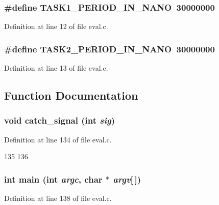 \subsubsection[{TASK1\_\-PERIOD\_\-IN\_\-NANO}]{\setlength{\rightskip}{0pt plus 5cm}\#define TASK1\_\-PERIOD\_\-IN\_\-NANO~30000000}\label{eval_8c_a502e8ff04fbdaca75759b6aa95a80260}


Definition at line 12 of file eval.c.
\subsubsection[{TASK2\_\-PERIOD\_\-IN\_\-NANO}]{\setlength{\rightskip}{0pt plus 5cm}\#define TASK2\_\-PERIOD\_\-IN\_\-NANO~30000000}\label{eval_8c_a7ca9dde848cb8a9965f2f05c0e00fd1d}


Definition at line 13 of file eval.c.

\subsection{Function Documentation}
\subsubsection[{catch\_\-signal}]{\setlength{\rightskip}{0pt plus 5cm}void catch\_\-signal (int {\em sig})}\label{eval_8c_af2dc378d0481adcc49b61efb98493a9b}


Definition at line 134 of file eval.c.


\begin{DoxyCode}
135 {
136 }
\end{DoxyCode}
\subsubsection[{main}]{\setlength{\rightskip}{0pt plus 5cm}int main (int {\em argc}, \/  char $\ast$ {\em argv}[$\,$])}\label{eval_8c_a0ddf1224851353fc92bfbff6f499fa97}


Definition at line 138 of file eval.c.


